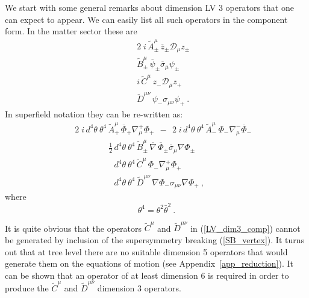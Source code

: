 \documentclass[12pt]{revtex4}
\begin{document}
We start with some general remarks about dimension LV 3 operators 
that one can expect to appear. 
We can easily list all such operators in the component form. In the matter sector these
are
\begin{eqnarray}
\nonumber
&& 2\;i\, \widetilde{A}_\pm^\mu\, \overline{z}_\pm 
\mathcal{D}_\mu z_\pm \\
\label{LV_dim3_comp}
&& \widetilde{B}_\pm^\mu\, \overline{\psi}_\pm\overline{\sigma}_\mu 
      \psi_\pm \\
\nonumber
&& i\, \widetilde{C}^\mu\, z_- \mathcal{D}_\mu z_+ \\
\nonumber
&& \widetilde{D}^{\mu\nu}\, \psi_- \sigma_{\mu\nu} 
     \psi_+~.
\end{eqnarray}
In superfield notation they can be re-written as:
\begin{eqnarray}
\nonumber
&&
2\;i\,  d^4\theta~ \theta^4\, \widetilde{A}_+^\mu\, 
\overline{\Phi}_+ \nabla^+_\mu \Phi_+
~~-~~
2\;i\,  d^4\theta~ \theta^4\, \widetilde{A}_-^\mu\, \Phi_- 
                        \nabla^-_\mu 
    \overline{\Phi}_-  \\
\label{LV_dim3}
&&
\qquad
\qquad
\frac{1}{2}\,
 d^4\theta~ \theta^4\, \widetilde{B}_\pm^\mu\, 
\overline{\nabla}\, \overline{\Phi}_\pm \overline{\sigma}_\mu \nabla \Phi_\pm \\
\nonumber
&&
\qquad
\qquad
\phantom{\frac{1}{2}\,}
d^4\theta~ \theta^4\, \widetilde{C}^\mu\, 
\Phi_- \nabla_\mu^+ \Phi_+ \\
\nonumber 
&&
\qquad
\qquad
\phantom{\frac{1}{2}\,}
d^4\theta~ \theta^4\, \widetilde{D}^{\mu\nu}\,
\nabla \Phi_- \sigma_{\mu\nu} \nabla \Phi_+~, 
\end{eqnarray}
where
\[
\theta^4 = \theta^2 \bar\theta^2~.
\]

It is quite obvious that the operators $ \widetilde{C}^\mu $
and $ \widetilde{D}^{\mu\nu} $ in (\ref{LV_dim3_comp}) cannot
be generated by inclusion of the supersymmetry breaking (\ref{SB_vertex}). 
It turns out that at tree level there are no suitable dimension 5 operators
that would generate them on the equations of motion 
(see Appendix~\ref{app_reduction}). It can be shown that an operator 
    of at least dimension 6 is required 
in order to produce the $ \widetilde{C}^\mu $
and $ \widetilde{D}^{\mu\nu} $ dimension 3 operators.
\end{document}
